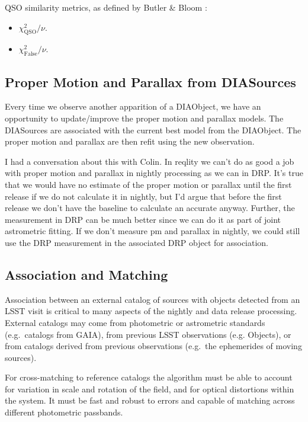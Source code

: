 QSO similarity metrics, as defined by Butler \& Bloom \cite{Butler11}:

\begin{itemize}
\item{$\chi_{\mathrm{QSO}}^2 / \nu$.}
\item{$\chi_{\mathrm{False}}^2 / \nu$.}
\end{itemize}

\subsection{Proper Motion and Parallax from DIASources}
\label{sec:acStellarMotionFitting}
Every time we observe another apparition of a DIAObject, we have an opportunity to update/improve the proper motion and parallax models.  The DIASources are associated with the current best model from the DIAObject.  The proper motion and parallax are then refit using the new observation.

\begin{note}
I had a conversation about this with Colin.  In reqlity we can't do as good a job with proper motion and parallax in nightly processing as we can in DRP.  It's true that we would have no estimate of the proper motion or parallax until the first release if we do not calculate it in nightly, but I'd argue that before the first release we don't have the baseline to calculate an accurate anyway.  Further, the measurement in DRP can be much better since we can do it as part of joint astrometric fitting.  If we don't measure pm and parallax in nightly, we could still use the DRP measurement in the associated DRP object for association.
\end{note}

\subsection{Association and Matching}
\label{sec:acMatching}

Association between an external catalog of sources with objects
detected from an LSST visit is critical to many aspects of the nightly
and data release processing. External catalogs may come from
photometric or astrometric standards (e.g.\ catalogs from GAIA), from
previous LSST observations (e.g. Objects), or from catalogs derived
from previous observations (e.g.\ the ephemerides of moving
sources). 

For cross-matching to reference catalogs the algorithm must be able to
account for variation in scale and rotation of the field, and for
optical distortions within the system. It must be fast and robust to
errors and capable of matching across different photometric passbands.

